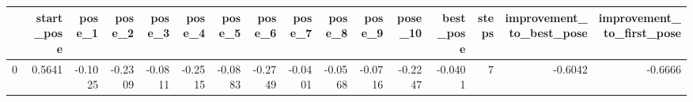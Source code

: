 \begin{tabular}{lrrrrrrrrrrrrrrr}
\toprule
{} &  start\_pose &  pose\_1 &  pose\_2 &  pose\_3 &  pose\_4 &  pose\_5 &  pose\_6 &  pose\_7 &  pose\_8 &  pose\_9 &  pose\_10 &  best\_pose &  steps &  improvement\_to\_best\_pose &  improvement\_to\_first\_pose \\
\midrule
0 &      0.5641 & -0.1025 & -0.2309 & -0.0811 & -0.2515 & -0.0883 & -0.2749 & -0.0401 & -0.0568 & -0.0716 &  -0.2247 &    -0.0401 &      7 &                   -0.6042 &                    -0.6666 \\
\bottomrule
\end{tabular}
